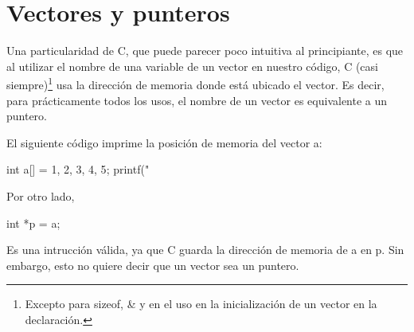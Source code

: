 
%
\renewcommand{\chaptermark}[1]{\markboth{#1}{}}
\renewcommand{\thesection}{\arabic{section}}
\chapter*{Vectores y punteros}

Una particularidad de C, que puede parecer poco intuitiva al principiante, es
que al utilizar el nombre de una variable de un vector en nuestro código, C
(casi siempre)\footnote{Excepto para sizeof, \& y en el uso en la
inicialización de un vector en la declaración.} usa la dirección de memoria
donde está ubicado el vector.  Es decir, para prácticamente todos los usos, el
nombre de un vector es equivalente a un puntero.

El siguiente código imprime la posición de memoria del vector a:
\begin{codigo-c-plano}
  int a[] = {1, 2, 3, 4, 5};
  printf("%
\end{codigo-c-plano}

Por otro lado,

\begin{codigo-c-plano}
  int *p = a; 
\end{codigo-c-plano}

Es una intrucción válida, ya que C guarda la dirección de memoria de a en p.
Sin embargo, esto no quiere decir que un vector sea un puntero. 

